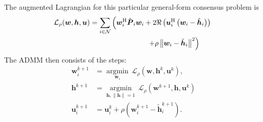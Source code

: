 \documentclass{article}
\newcommand{\hf}{{\bm{h}}}
\newcommand{\wf}{{\bm{w}}}
\newcommand{\uuf}{{\bm{u}}}
\newcommand{\aRhof}{{\bm{{P}}}}
\newcommand{\I}{\mtxb{I}}
\newcommand{\Mset}{\mathcal{M}}
\newcommand{\Nset}{\mathcal{N}}
\begin{document}
The augmented Lagrangian for this particular general-form consensus problem is
\begin{align}
    \mathcal{L}_{\rho} (\wf,\hf,\uuf) &= \sum_{i \in \Nset} \left( \wf_i^\herm \hat{\aRhof}_i \wf_i + 2 \Re \left( \uuf_i^{\herm} \left(\wf_i - \tilde{\hf}_i\right) \right)\right. \vphantom{+ \rho \left\| \wf_i - \tilde{\hf}_i \right\|} \nonumber\\
    \vphantom{\wf_i^\herm \hat{\aRhof}_i \wf_i + 2 \Re \left( \uuf_i^{\herm} \left(\wf_i - \tilde{\hf}_i\right) \right)} & \qquad \qquad \qquad \qquad \left.+ \rho \left\| \wf_i - \tilde{\hf}_i \right\|^2 \right)\label{eq:general_consensus_admm:lagrangian}
\end{align}
The ADMM then consists of the steps:
\begin{align}
    \wf_i^{k+1} &= \underset{\wf_i}{\operatorname{argmin}} \, \mathcal{L}_{\rho} (\wf,\hf^k,\uuf^k),\label{eq:general_consensus_admm:local}\\
    \hf^{k+1} &= \underset{\hf, \|\hf\| = 1}{\operatorname{argmin}}\, \mathcal{L}_{\rho} (\wf^{k+1},\hf,\uuf^k)\label{eq:general_consensus_admm:global}\\
    \uuf_i^{k+1} &= \uuf_i^{k} + \rho \left( \wf_i^{k+1} - \tilde{\hf}_i^{k+1} \right).\label{eq:general_consensus_admm:dual}
\end{align}
\end{document}
